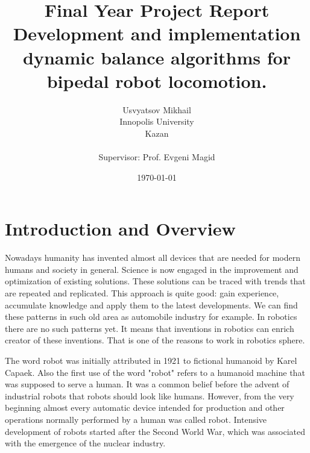 \documentclass[12pt,a4paper]{report}
\begin{document}
	
	\title{Final Year Project Report\\ Development and implementation dynamic balance algorithms for bipedal robot locomotion.}
	\author{Usvyatsov Mikhail\\Innopolis University\\Kazan\\  ~\\ \normalsize Supervisor: Prof. Evgeni Magid}
	\date{\normalsize \today}
	\maketitle
	
	\tableofcontents
	
	\newpage

	\chapter{Introduction and Overview}
		Nowadays humanity has invented almost all devices that are needed for modern humans and society in general. Science is now engaged in the improvement and optimization of existing solutions. These solutions can be traced with trends that are repeated and replicated. This approach is quite good: gain experience, accumulate knowledge and apply them to the latest developments. We can find these patterns in such old area as automobile industry for example. In robotics there are no such patterns yet. It means that inventions in robotics can enrich creator of these inventions. That is one of the reasons to work in robotics sphere.
	
		The word robot was initially attributed in 1921 to fictional humanoid by Karel Capaek. Also the first use of the word "robot" refers to a humanoid machine that was supposed to serve a human. It was a common belief before the advent of industrial robots that robots should look like humans. However, from the very beginning almost every automatic device intended for production and other operations normally performed by a human was called robot. Intensive development of robots started after the Second World War, which was associated with the emergence of the nuclear industry.
		
\end{document}
